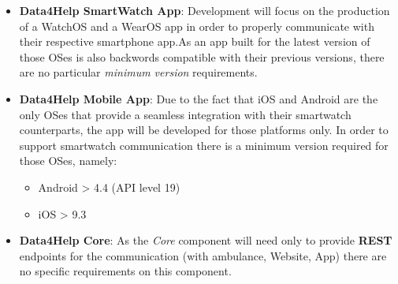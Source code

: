 \begin{itemize}
    \item \textbf{Data4Help SmartWatch App}: Development will focus on the production of a WatchOS and a WearOS app in order to properly communicate with their respective smartphone app.\newline As an app built for the latest version of those OSes is also backwords compatible with their previous versions, there are no particular \textit{minimum version} requirements.
    \item \textbf{Data4Help Mobile App}: Due to the fact that iOS and Android are the only OSes that provide a seamless integration with their smartwatch counterparts, the app will be developed for those platforms only.
    In order to support smartwatch communication there is a minimum version required for those OSes, namely:
    \begin{itemize}
        \item Android \textgreater \vspace{0.1cm} 4.4 (API level 19)
        \item iOS \textgreater \vspace{0.4cm} 9.3
    \end{itemize}
    \item \textbf{Data4Help Core}: As the \textit{Core} component will need only to provide \textbf{REST} endpoints for the communication (with ambulance, Website, App) there are no specific requirements on this component.
\end{itemize}


